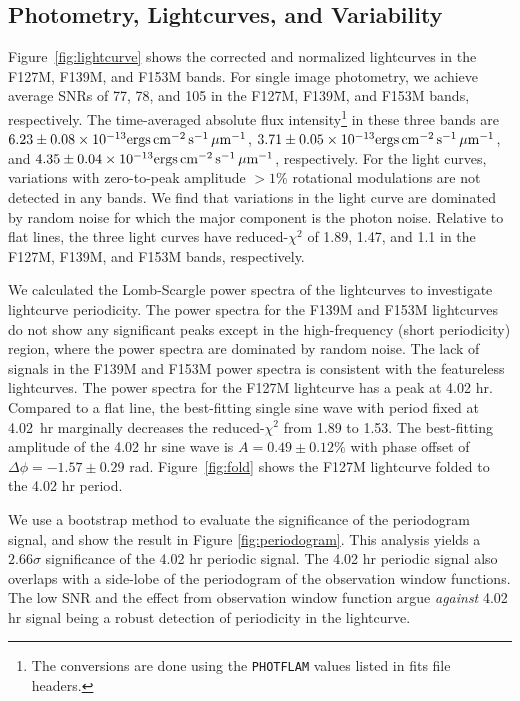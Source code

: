 \documentclass[twocolumn]{aastex62}
\newcommand{\fluxunit}{\ensuremath{\mathrm{ergs}\,\mathrm{cm^{-2}}\,\mathrm{s^{-1}}\,\mathrm{\micron^{{-1}}}}}
\begin{document}
\subsection{Photometry, Lightcurves, and Variability}

Figure~\ref{fig:lightcurve} shows the corrected and normalized lightcurves in the F127M, F139M, and F153M bands. For single image photometry, we achieve average SNRs of  77, 78, and 105 in the F127M, F139M, and F153M bands, respectively. The time-averaged absolute flux intensity\footnote{The conversions are done using the \texttt{PHOTFLAM} values listed in fits file headers.} in these three bands are $6.23\pm0.08\times10^{-13}\fluxunit$, $3.71\pm0.05\times10^{-13}\fluxunit$, and $4.35\pm0.04\times10^{{-13}}\fluxunit$, respectively.
For the light curves, variations with zero-to-peak amplitude $>1\%$ rotational modulations are not detected in any bands. We find that variations in the light curve are dominated by random noise for which the major component is the photon noise. Relative to flat lines, the three light curves have reduced-$\chi^{2}$ of 1.89, 1.47, and 1.1 in the F127M, F139M, and F153M bands, respectively.

We calculated the Lomb-Scargle power spectra \citep[][Figure~\ref{fig:periodogram}]{Lomb1976} of the lightcurves to investigate lightcurve periodicity. The power spectra for the F139M and F153M lightcurves do not show any significant peaks except in the high-frequency (short periodicity) region, where the power spectra are dominated by random noise. The lack of signals in the F139M and F153M power spectra is consistent with the featureless lightcurves. The power spectra for the F127M lightcurve has a peak at 4.02 hr. Compared to a flat line, the best-fitting single sine wave with period fixed at 4.02~hr marginally decreases the reduced-$\chi^{2}$ from 1.89 to 1.53. The best-fitting amplitude of the 4.02 hr sine wave is $A = 0.49\pm0.12\%$ with phase offset of $\Delta \phi = -1.57\pm0.29$ rad. Figure~\ref{fig:fold} shows the F127M lightcurve folded to the 4.02 hr period.

We use a bootstrap method \citep{Manjavacas2017,Zhou2019} to evaluate the significance of the periodogram signal, and show the result in Figure \ref{fig:periodogram}. This analysis yields a $2.66\sigma$ significance of the 4.02 hr periodic signal. The 4.02 hr periodic signal also overlaps with a side-lobe of the periodogram of the observation window functions. The low SNR and the effect from observation window function argue \emph{against} 4.02 hr signal being a robust detection of periodicity in the lightcurve.
\end{document}
